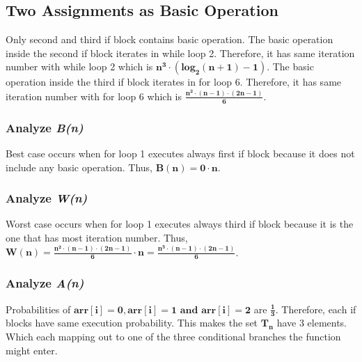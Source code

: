 \documentclass[10pt]{article}
\begin{document}
\subsection{Two Assignments as Basic Operation}
Only second and third if block contains basic operation. The basic operation inside the second if block iterates in while loop 2. Therefore, it has same iteration number with while loop 2 which is $\mathbf{ n^3 \cdot (log_2(n+1) - 1)}$. The basic operation inside the third if block iterates in for loop 6. Therefore, it has same iteration number with for loop 6 which is  $\mathbf{\frac{ n^2\cdot (n-1) \cdot (2n-1) } {6}}$.   
\subsubsection{Analyze \textit{B(n)}}
Best case occurs when for loop 1 executes always first if block because it does not include any basic operation. Thus, $\mathbf{B(n) = 0 \cdot n}$.
\subsubsection{Analyze \textit{W(n)}}
Worst case occurs when for loop 1 executes always third if block because it is the one that has most iteration number. Thus, $\mathbf{W(n) = \frac{ n^2\cdot (n-1) \cdot (2n-1) } {6} \cdot n = \frac{ n^3\cdot (n-1) \cdot (2n-1) } {6}}$.
\subsubsection{Analyze \textit{A(n)}}
Probabilities of $\mathbf{arr[i]=0 ,arr[i]=1 \text { and } arr[i]=2}$ are $\boldsymbol{\frac{1}{3}}$. Therefore, each if blocks have same execution probability.
This makes the set $\mathbf{T_{n}}$ have 3 elements. Which each mapping out to one of the three conditional branches the function might enter. 
\end{document}
